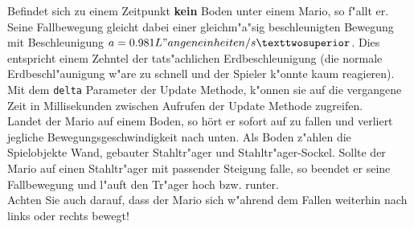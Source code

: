 Befindet sich zu einem Zeitpunkt \textbf{kein} Boden unter einem Mario, so f"allt er. Seine Fallbewegung gleicht dabei einer gleichm"a"sig beschleunigten Bewegung mit Beschleunigung $ a = 0.981 L"angeneinheiten/s²$. Dies entspricht einem Zehntel der tats"achlichen Erdbeschleunigung (die normale Erdbeschl"aunigung w"are zu schnell und der Spieler k"onnte kaum reagieren). Mit dem \texttt{delta} Parameter der Update Methode, k"onnen sie auf die vergangene Zeit in Millisekunden zwischen Aufrufen der Update Methode zugreifen.\\
Landet der Mario auf einem Boden, so hört er sofort auf zu fallen und verliert jegliche Bewegungsgeschwindigkeit nach unten.
Als Boden z"ahlen die Spielobjekte Wand, gebauter Stahltr"ager und Stahltr"ager-Sockel.
Sollte der Mario auf einen Stahltr"ager mit passender Steigung falle, so beendet er seine Fallbewegung und l"auft den Tr"ager hoch bzw. runter.\\
Achten Sie auch darauf, dass der Mario sich w"ahrend dem Fallen weiterhin nach links oder rechts bewegt!
